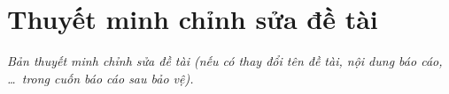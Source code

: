 \chapter*{Thuyết minh chỉnh sửa đề tài}
\label{edit}

\textit{Bản thuyết minh chỉnh sửa đề tài (nếu có thay đổi tên đề tài, nội dung báo cáo, \dots\ trong cuốn báo cáo sau bảo vệ).}

\vfill
